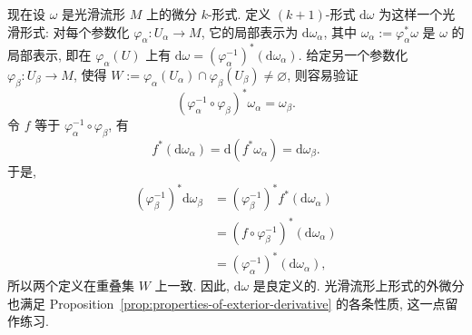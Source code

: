 现在设 $\omega$ 是光滑流形 $M$ 上的微分 $k$-形式. 定义 $(k+1)$-形式 $\mathrm{d}\omega$ 为这样一个光滑形式: 对每个参数化 $\varphi_\alpha:U_\alpha\to M$, 它的局部表示为 $\mathrm{d}\omega_\alpha$, 其中 $\omega_\alpha:=\varphi_\alpha^*\omega$ 是 $\omega$ 的局部表示, 即在 $\varphi_\alpha(U)$ 上有 $\mathrm{d}\omega=(\varphi_\alpha^{-1})^*(\mathrm{d}\omega_\alpha)$. 给定另一个参数化 $\varphi_\beta:U_\beta\to M$, 使得 $W:=\varphi_\alpha(U_\alpha)\cap\varphi_\beta(U_\beta)\ne\varnothing$, 则容易验证
\[
  (\varphi_\alpha^{-1}\circ\varphi_\beta)^*\omega_\alpha=\omega_\beta.
\]
令 $f$ 等于 $\varphi_\alpha^{-1}\circ\varphi_\beta$, 有
\[
  f^*(\mathrm{d}\omega_\alpha)=\mathrm{d}(f^*\omega_\alpha)=\mathrm{d}\omega_\beta.
\]
于是,
\begin{align*}
  (\varphi_\beta^{-1})^*\mathrm{d}\omega_\beta
  &=(\varphi_\beta^{-1})^*f^*(\mathrm{d}\omega_\alpha)\\
  &=(f\circ\varphi_\beta^{-1})^*(\mathrm{d}\omega_\alpha)\\
  &=(\varphi_\alpha^{-1})^*(\mathrm{d}\omega_\alpha),
\end{align*}
所以两个定义在重叠集 $W$ 上一致. 因此, $\mathrm{d}\omega$ 是良定义的. 光滑流形上形式的外微分也满足 Proposition~\ref{prop:properties-of-exterior-derivative} 的各条性质, 这一点留作练习.

